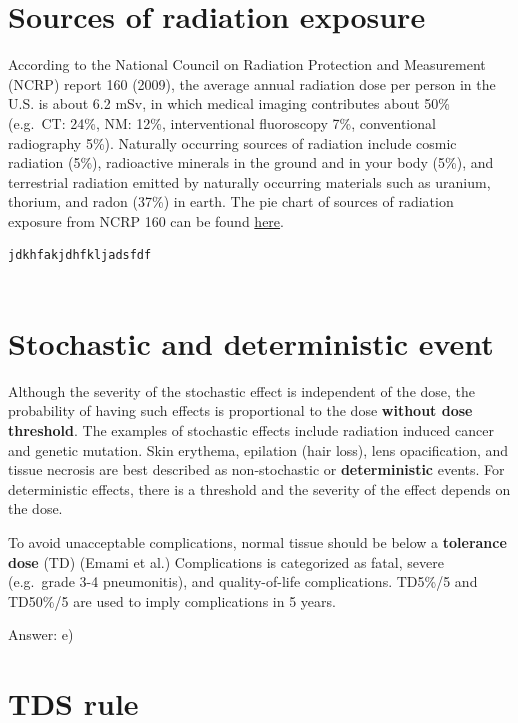 \documentclass[]{book}
\theoremstyle{definition}
\theoremstyle{definition}
\theoremstyle{definition}
\theoremstyle{remark}
\begin{document}
\section{Sources of radiation
exposure}\label{sources-of-radiation-exposure}

According to the National Council on Radiation Protection and
Measurement (NCRP) report 160 (2009), the average annual radiation dose
per person in the U.S. is about 6.2 mSv, in which medical imaging
contributes about 50\% (e.g.~CT: 24\%, NM: 12\%, interventional
fluoroscopy 7\%, conventional radiography 5\%). Naturally occurring
sources of radiation include cosmic radiation (5\%), radioactive
minerals in the ground and in your body (5\%), and terrestrial radiation
emitted by naturally occurring materials such as uranium, thorium, and
radon (37\%) in earth. The pie chart of sources of radiation exposure
from NCRP 160 can be found
\href{https://19january2017snapshot.epa.gov/radiation/radiation-sources-and-doses_.html}{here}.

\begin{verbatim}
jdkhfakjdhfkljadsfdf
  
\end{verbatim}

\section{Stochastic and deterministic
event}\label{stochastic-and-deterministic-event}

Although the severity of the stochastic effect is independent of the
dose, the probability of having such effects is proportional to the dose
\textbf{without dose threshold}. The examples of stochastic effects
include radiation induced cancer and genetic mutation. Skin erythema,
epilation (hair loss), lens opacification, and tissue necrosis are best
described as non-stochastic or \textbf{deterministic} events. For
deterministic effects, there is a threshold and the severity of the
effect depends on the dose.

To avoid unacceptable complications, normal tissue should be below a
\textbf{tolerance dose} (TD) (Emami et al.) Complications is categorized
as fatal, severe (e.g.~grade 3-4 pneumonitis), and quality-of-life
complications. TD5\%/5 and TD50\%/5 are used to imply complications in 5
years.

Answer: e)

\section{TDS rule}\label{tds-rule}
\end{document}
